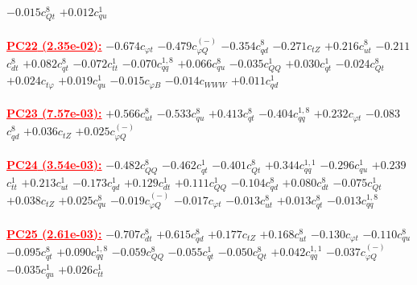 \documentclass{article}
\begin{document}
{$-0.015$}{\rm $c_{Qt}^{8}$} 
{$+0.012$}{\rm $c_{qu}^{1}$} 
 \nonumber \\ \nonumber \\ 
\noindent \textcolor{red}{\underline{\bf{PC22} (2.35e-02):}}
{$-0.674$}{\rm $c_{\varphi t}$} 
{$-0.479$}{\rm $c_{\varphi Q}^{(-)}$} 
{$-0.354$}{\rm $c_{qd}^{8}$} 
{$-0.271$}{\rm $c_{tZ}$} 
{$+0.216$}{\rm $c_{ut}^{8}$} 
{$-0.211$}{\rm $c_{dt}^{8}$} 
{$+0.082$}{\rm $c_{qt}^{8}$} 
{$-0.072$}{\rm $c_{tt}^{1}$} 
{$-0.070$}{\rm $c_{qq}^{1,8}$} 
{$+0.066$}{\rm $c_{qu}^{8}$} 
{$-0.035$}{\rm $c_{QQ}^{1}$} 
{$+0.030$}{\rm $c_{qt}^{1}$} 
{$-0.024$}{\rm $c_{Qt}^{8}$} 
{$+0.024$}{\rm $c_{t \varphi}$} 
{$+0.019$}{\rm $c_{qu}^{1}$} 
{$-0.015$}{\rm $c_{\varphi B}$} 
{$-0.014$}{\rm $c_{WWW}$} 
{$+0.011$}{\rm $c_{qd}^{1}$} 
 \nonumber \\ \nonumber \\ 
\noindent \textcolor{red}{\underline{\bf{PC23} (7.57e-03):}}
{$+0.566$}{\rm $c_{ut}^{8}$} 
{$-0.533$}{\rm $c_{qu}^{8}$} 
{$+0.413$}{\rm $c_{qt}^{8}$} 
{$-0.404$}{\rm $c_{qq}^{1,8}$} 
{$+0.232$}{\rm $c_{\varphi t}$} 
{$-0.083$}{\rm $c_{qd}^{8}$} 
{$+0.036$}{\rm $c_{tZ}$} 
{$+0.025$}{\rm $c_{\varphi Q}^{(-)}$} 
 \nonumber \\ \nonumber \\ 
\noindent \textcolor{red}{\underline{\bf{PC24} (3.54e-03):}}
{$-0.482$}{\rm $c_{QQ}^{8}$} 
{$-0.462$}{\rm $c_{qt}^{1}$} 
{$-0.401$}{\rm $c_{Qt}^{8}$} 
{$+0.344$}{\rm $c_{qq}^{1,1}$} 
{$-0.296$}{\rm $c_{qu}^{1}$} 
{$+0.239$}{\rm $c_{tt}^{1}$} 
{$+0.213$}{\rm $c_{ut}^{1}$} 
{$-0.173$}{\rm $c_{qd}^{1}$} 
{$+0.129$}{\rm $c_{dt}^{1}$} 
{$+0.111$}{\rm $c_{QQ}^{1}$} 
{$-0.104$}{\rm $c_{qd}^{8}$} 
{$+0.080$}{\rm $c_{dt}^{8}$} 
{$-0.075$}{\rm $c_{Qt}^{1}$} 
{$+0.038$}{\rm $c_{tZ}$} 
{$+0.025$}{\rm $c_{qu}^{8}$} 
{$-0.019$}{\rm $c_{\varphi Q}^{(-)}$} 
{$-0.017$}{\rm $c_{\varphi t}$} 
{$-0.013$}{\rm $c_{ut}^{8}$} 
{$+0.013$}{\rm $c_{qt}^{8}$} 
{$-0.013$}{\rm $c_{qq}^{1,8}$} 
 \nonumber \\ \nonumber \\ 
\noindent \textcolor{red}{\underline{\bf{PC25} (2.61e-03):}}
{$-0.707$}{\rm $c_{dt}^{8}$} 
{$+0.615$}{\rm $c_{qd}^{8}$} 
{$+0.177$}{\rm $c_{tZ}$} 
{$+0.168$}{\rm $c_{ut}^{8}$} 
{$-0.130$}{\rm $c_{\varphi t}$} 
{$-0.110$}{\rm $c_{qu}^{8}$} 
{$-0.095$}{\rm $c_{qt}^{8}$} 
{$+0.090$}{\rm $c_{qq}^{1,8}$} 
{$-0.059$}{\rm $c_{QQ}^{8}$} 
{$-0.055$}{\rm $c_{qt}^{1}$} 
{$-0.050$}{\rm $c_{Qt}^{8}$} 
{$+0.042$}{\rm $c_{qq}^{1,1}$} 
{$-0.037$}{\rm $c_{\varphi Q}^{(-)}$} 
{$-0.035$}{\rm $c_{qu}^{1}$} 
{$+0.026$}{\rm $c_{tt}^{1}$} 
\end{document}
